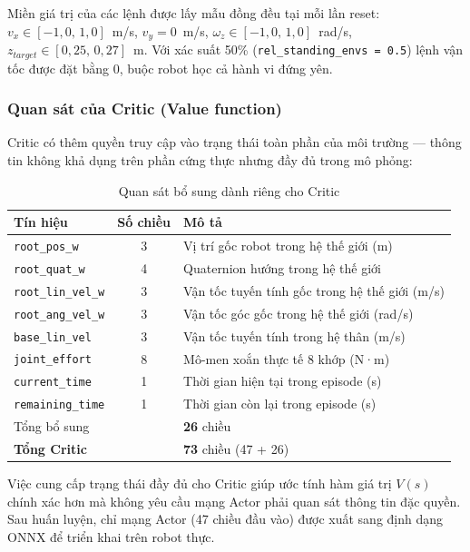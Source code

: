Miền giá trị của các lệnh được lấy mẫu đồng đều tại mỗi lần reset:
$v_x \in [-1{,}0,\,1{,}0]$~m/s, $v_y = 0$~m/s,
$\omega_z \in [-1{,}0,\,1{,}0]$~rad/s,
$z_{target} \in [0{,}25,\,0{,}27]$~m.
Với xác suất 50\% (\texttt{rel\_standing\_envs = 0.5}) lệnh vận tốc được đặt
bằng 0, buộc robot học cả hành vi đứng yên.

\subsubsection{Quan sát của Critic (Value function)}

Critic có thêm quyền truy cập vào trạng thái toàn phần của môi trường —
thông tin không khả dụng trên phần cứng thực nhưng đầy đủ trong mô phỏng:

\begin{table}[H]
    \centering
    \caption{Quan sát bổ sung dành riêng cho Critic}
    \label{tab:obs_critic}
    \renewcommand{\arraystretch}{1.3}
    \begin{tabular}{|l|c|l|}
    \hline
    \textbf{Tín hiệu} & \textbf{Số chiều} & \textbf{Mô tả} \\
    \hline
    \texttt{root\_pos\_w}     & 3  & Vị trí gốc robot trong hệ thế giới (m) \\
    \texttt{root\_quat\_w}    & 4  & Quaternion hướng trong hệ thế giới \\
    \texttt{root\_lin\_vel\_w}& 3  & Vận tốc tuyến tính gốc trong hệ thế giới (m/s) \\
    \texttt{root\_ang\_vel\_w}& 3  & Vận tốc góc gốc trong hệ thế giới (rad/s) \\
    \texttt{base\_lin\_vel}   & 3  & Vận tốc tuyến tính trong hệ thân (m/s) \\
    \texttt{joint\_effort}    & 8  & Mô-men xoắn thực tế 8 khớp (N·m) \\
    \texttt{current\_time}    & 1  & Thời gian hiện tại trong episode (s) \\
    \texttt{remaining\_time}  & 1  & Thời gian còn lại trong episode (s) \\
    \hline
    \multicolumn{2}{|l|}{Tổng bổ sung} & \textbf{26} chiều \\
    \hline
    \multicolumn{2}{|l|}{\textbf{Tổng Critic}} & \textbf{73} chiều (47 + 26) \\
    \hline
    \end{tabular}
\end{table}

Việc cung cấp trạng thái đầy đủ cho Critic giúp ước tính hàm giá trị
$V(s)$ chính xác hơn mà không yêu cầu mạng Actor phải quan sát thông tin
đặc quyền. Sau huấn luyện, chỉ mạng Actor (47 chiều đầu vào) được
xuất sang định dạng ONNX để triển khai trên robot thực.

